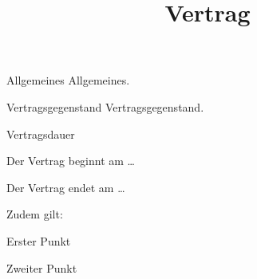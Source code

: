 \documentclass[parskip=half]{Classes/custom_contract}
\title{Vertrag}
\begin{document}
\maketitle

\begin{article}{Allgemeines}
    Allgemeines.
\end{article}

\begin{article}{Vertragsgegenstand}
    Vertragsgegenstand.
\end{article}

\begin{article}{Vertragsdauer}
    \begin{paragraphs}
        \item Der Vertrag beginnt am \ldots
        \item Der Vertrag endet am \ldots
        \item Zudem gilt:
        \begin{letters}
            \item Erster Punkt
            \item Zweiter Punkt
        \end{letters}
    \end{paragraphs}
\end{article}

\printsignaturelines
\end{document}
